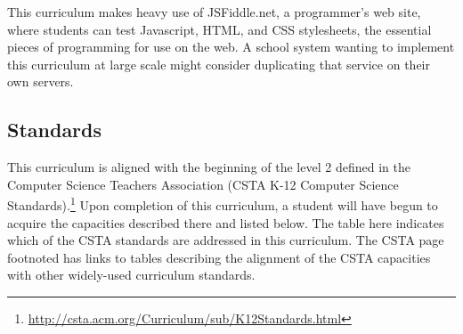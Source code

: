 \documentclass[11pt]{article}
\begin{document}
This curriculum makes heavy use of JSFiddle.net, a programmer's web
site, where students can test Javascript, HTML, and CSS stylesheets,
the essential pieces of programming for use on the web.  A school
system wanting to implement this curriculum at large scale might
consider duplicating that service on their own servers.

\subsection{Standards}

This curriculum is aligned with the beginning of the level 2 defined
in the Computer Science Teachers Association (CSTA K-12 Computer
Science
Standards).\footnote{\url{http://csta.acm.org/Curriculum/sub/K12Standards.html}}
Upon completion of this curriculum, a student will have begun to
acquire the capacities described there and listed below.  The table
here indicates which of the CSTA standards are addressed in this
curriculum.  The CSTA page footnoted has links to tables describing the
alignment of the CSTA capacities with other widely-used curriculum
standards.
\end{document}
